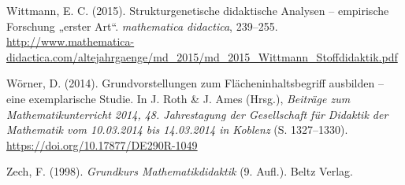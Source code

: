 \documentclass[
  ngerman,
]{scrbook}
\newlength{\cslhangindent}
\newlength{\cslentryspacingunit} %
\newenvironment{CSLReferences}[2] %
 {%
  \setlength{\parindent}{0pt}
  \ifodd #1
  \let\oldpar\par
  \def\par{\hangindent=\cslhangindent\oldpar}
  \fi
  \setlength{\parskip}{#2\cslentryspacingunit}
 }%
 {}
\theoremstyle{definition}
\theoremstyle{definition}
\theoremstyle{definition}
\theoremstyle{definition}
\theoremstyle{remark}
\begin{document}
\begin{CSLReferences}{1}{0}
\leavevmode{}%
Wittmann, E. C. (2015). Strukturgenetische didaktische {Analysen} -- empirische {Forschung} „erster {Art}``. \emph{mathematica didactica}, 239--255. \url{http://www.mathematica-didactica.com/altejahrgaenge/md_2015/md_2015_Wittmann_Stoffdidaktik.pdf}

\leavevmode{}%
Wörner, D. (2014). Grundvorstellungen zum {Flächeninhaltsbegriff} ausbilden -- eine exemplarische {Studie}. In J. Roth \& J. Ames (Hrsg.), \emph{Beiträge zum {Mathematikunterricht} 2014, 48. {Jahrestagung} der {Gesellschaft} für {Didaktik} der {Mathematik} vom 10.03.2014 bis 14.03.2014 in {Koblenz}} (S. 1327--1330). \url{https://doi.org/10.17877/DE290R-1049}

\leavevmode{}%
Zech, F. (1998). \emph{Grundkurs {Mathematikdidaktik}} (9. Aufl.). Beltz Verlag.

\end{CSLReferences}
\end{document}
